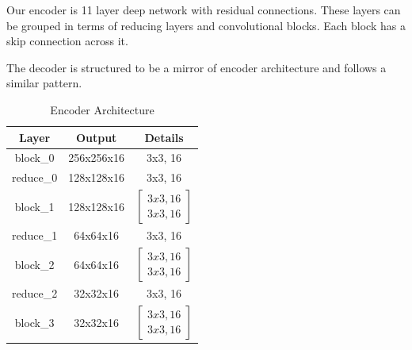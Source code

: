 \documentclass[11pt,a4paper]{article}
\begin{document}
Our encoder is 11 layer deep network with residual connections. These layers can be grouped in terms of reducing layers and convolutional blocks. Each block has a skip connection across it. 

The decoder is structured to be a mirror of encoder architecture and follows a similar pattern.

\begin{table}[h]
\begin{center}
\begin{tabular}{|c|c|c|}
\hline \textbf{Layer} & \textbf{Output} & \textbf{Details} \\ \hline
block\_0 & 256x256x16 & 3x3, 16 \\
reduce\_0 & 128x128x16 & 3x3, 16\\
block\_1 & 128x128x16 & 
$[\begin{array}{l}
    3x3, 16 \\
    3x3, 16
  \end{array}]$\\
reduce\_1 & 64x64x16 & 3x3, 16\\
block\_2 & 64x64x16 & 
$[\begin{array}{l}
    3x3, 16 \\
    3x3, 16
  \end{array}]$\\
reduce\_2 & 32x32x16 & 3x3, 16\\
block\_3 & 32x32x16 & 
$[\begin{array}{l}
    3x3, 16 \\
    3x3, 16
  \end{array}]$\\
\hline
\end{tabular}
\end{center}
\caption{\label{encoder} Encoder Architecture }
\end{table}
\end{document}
